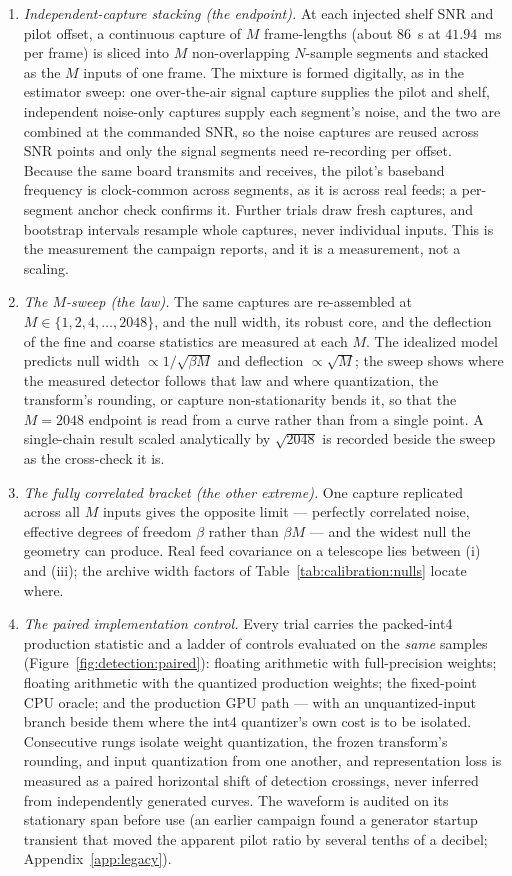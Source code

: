 \begin{enumerate}[leftmargin=1.6em]
\item \emph{Independent-capture stacking (the endpoint).} At each injected shelf SNR and pilot offset, a continuous capture of $M$ frame-lengths (about $86$~s at $41.94$~ms per frame) is sliced into $M$ non-overlapping $N$-sample segments and stacked as the $M$ inputs of one frame. The mixture is formed digitally, as in the estimator sweep: one over-the-air signal capture supplies the pilot and shelf, independent noise-only captures supply each segment's noise, and the two are combined at the commanded SNR, so the noise captures are reused across SNR points and only the signal segments need re-recording per offset. Because the same board transmits and receives, the pilot's baseband frequency is clock-common across segments, as it is across real feeds; a per-segment anchor check confirms it. Further trials draw fresh captures, and bootstrap intervals resample whole captures, never individual inputs. This is the measurement the campaign reports, and it is a measurement, not a scaling.
\item \emph{The $M$-sweep (the law).} The same captures are re-assembled at $M \in \{1, 2, 4, \dots, 2048\}$, and the null width, its robust core, and the deflection of the fine and coarse statistics are measured at each $M$. The idealized model predicts null width $\propto 1/\sqrt{\beta M}$ and deflection $\propto \sqrt{M}$; the sweep shows where the measured detector follows that law and where quantization, the transform's rounding, or capture non-stationarity bends it, so that the $M = 2048$ endpoint is read from a curve rather than from a single point. A single-chain result scaled analytically by $\sqrt{2048}$ is recorded beside the sweep as the cross-check it is.
\item \emph{The fully correlated bracket (the other extreme).} One capture replicated across all $M$ inputs gives the opposite limit --- perfectly correlated noise, effective degrees of freedom $\beta$ rather than $\beta M$ --- and the widest null the geometry can produce. Real feed covariance on a telescope lies between (i) and (iii); the archive width factors of Table~\ref{tab:calibration:nulls} locate where.
\item \emph{The paired implementation control.} Every trial carries the packed-int4 production statistic and a ladder of controls evaluated on the \emph{same} samples (Figure~\ref{fig:detection:paired}): floating arithmetic with full-precision weights; floating arithmetic with the quantized production weights; the fixed-point CPU oracle; and the production GPU path --- with an unquantized-input branch beside them where the int4 quantizer's own cost is to be isolated. Consecutive rungs isolate weight quantization, the frozen transform's rounding, and input quantization from one another, and representation loss is measured as a paired horizontal shift of detection crossings, never inferred from independently generated curves. The waveform is audited on its stationary span before use (an earlier campaign found a generator startup transient that moved the apparent pilot ratio by several tenths of a decibel; Appendix~\ref{app:legacy}).
\end{enumerate}


